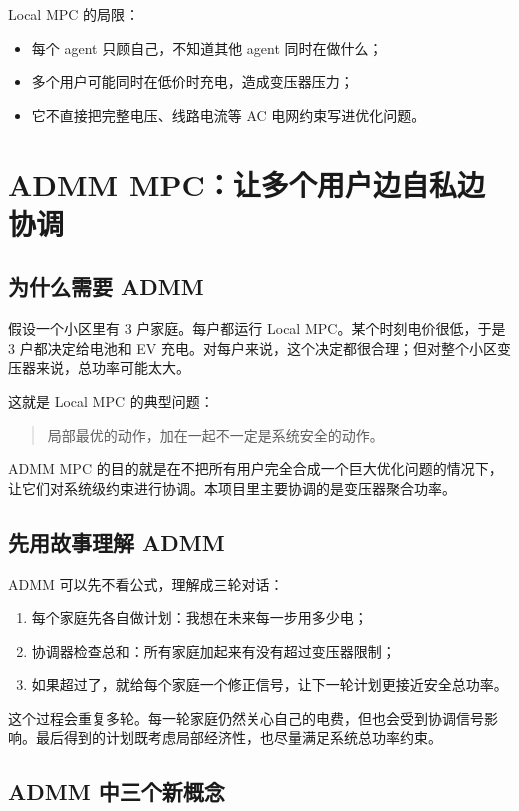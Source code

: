\documentclass[UTF8,zihao=-4]{ctexart}
\begin{document}
Local MPC 的局限：
\begin{itemize}
  \item 每个 agent 只顾自己，不知道其他 agent 同时在做什么；
  \item 多个用户可能同时在低价时充电，造成变压器压力；
  \item 它不直接把完整电压、线路电流等 AC 电网约束写进优化问题。
\end{itemize}

\section{ADMM MPC：让多个用户边自私边协调}

\subsection{为什么需要 ADMM}

假设一个小区里有 3 户家庭。每户都运行 Local MPC。某个时刻电价很低，于是 3 户都决定给电池和 EV 充电。对每户来说，这个决定都很合理；但对整个小区变压器来说，总功率可能太大。

这就是 Local MPC 的典型问题：
\begin{quote}
局部最优的动作，加在一起不一定是系统安全的动作。
\end{quote}

ADMM MPC 的目的就是在不把所有用户完全合成一个巨大优化问题的情况下，让它们对系统级约束进行协调。本项目里主要协调的是变压器聚合功率。

\subsection{先用故事理解 ADMM}

ADMM 可以先不看公式，理解成三轮对话：
\begin{enumerate}
  \item 每个家庭先各自做计划：我想在未来每一步用多少电；
  \item 协调器检查总和：所有家庭加起来有没有超过变压器限制；
  \item 如果超过了，就给每个家庭一个修正信号，让下一轮计划更接近安全总功率。
\end{enumerate}

这个过程会重复多轮。每一轮家庭仍然关心自己的电费，但也会受到协调信号影响。最后得到的计划既考虑局部经济性，也尽量满足系统总功率约束。

\subsection{ADMM 中三个新概念}
\end{document}
